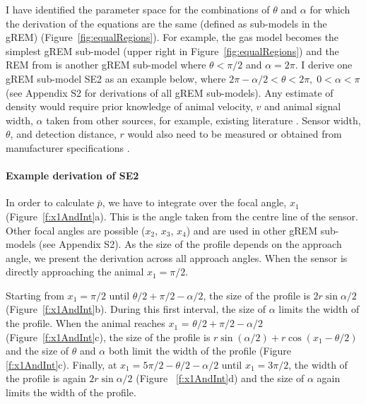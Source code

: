 I have identified the parameter space for the combinations of $\theta$ and $\alpha$ for which the derivation of the equations are the same (defined as sub-models in the gREM) (Figure~\ref{fig:equalRegions}).
For example, the gas model becomes the simplest gREM sub-model (upper right in Figure~\ref{fig:equalRegions}) and the REM from \cite{rowcliffe2008estimating} is another gREM sub-model where $\theta<\pi/2$ and $\alpha = 2\pi$.
I derive one gREM sub-model SE2 as an example below, where $2 \pi - \alpha/2 < \theta < 2\pi ,\; 0 < \alpha <\pi$ (see Appendix S2 for derivations of all gREM sub-models).
Any estimate of density would require prior knowledge of animal velocity, $v$ and animal signal width, $\alpha$ taken from other sources, for example, existing literature \cite{brinklov2011, carbone2005far}.
Sensor width, $\theta$, and detection distance, $r$ would also need to be measured or obtained from manufacturer specifications \cite{holderied2003echolocation, adams2012you}.


\paragraph{Example derivation of SE2}

In order to calculate $\bar{p}$, we have to integrate over the focal angle, $x_1$ (Figure~\ref{f:x1AndInt}a).
This is the angle taken from the centre line of the sensor.
Other focal angles are possible ($x_2$, $x_3$, $x_4$) and are used in other gREM sub-models (see Appendix S2).
As the size of the profile depends on the approach angle, we present the derivation across all approach angles.
When the sensor is directly approaching the animal $x_1  = \pi/2$.

Starting from $x_1 = \pi/2$ until $\theta/2 + \pi/2 - \alpha/2$, the size of the profile is $2r\sin \alpha/2$ (Figure~\ref{f:x1AndInt}b).
During this first interval, the size of $\alpha$ limits the width of the profile.
When the animal reaches $x_1$  = $\theta/2 + \pi/2 - \alpha/2$ (Figure~\ref{f:x1AndInt}c), the size of the profile is $r\sin( \alpha/2) + r\cos( x_1  - \theta/2)$ and the size of $\theta$ and $\alpha$ both limit the width of the profile (Figure~ \ref{f:x1AndInt}c).
Finally, at $x_1  = 5\pi/2 - \theta/2  - \alpha/2$ until $x_1  = 3\pi/2$, the width of the profile is again $2r\sin\alpha/2$ (Figure~ \ref{f:x1AndInt}d) and the size of $\alpha$ again limits the width of the profile. 


